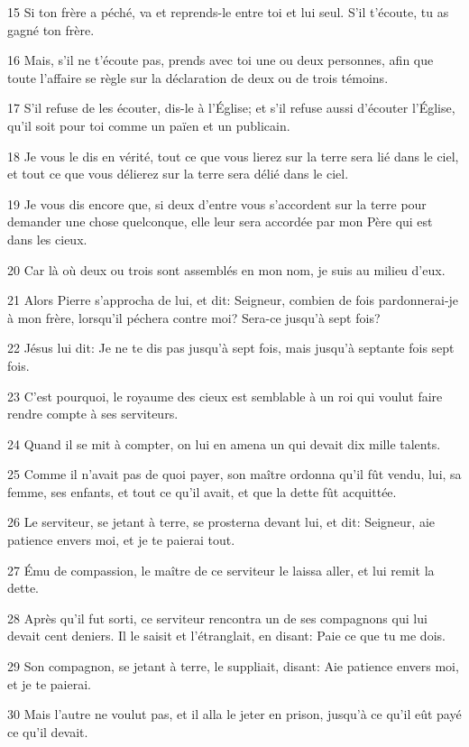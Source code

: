 \par 15 Si ton frère a péché, va et reprends-le entre toi et lui seul. S'il t'écoute, tu as gagné ton frère.
\par 16 Mais, s'il ne t'écoute pas, prends avec toi une ou deux personnes, afin que toute l'affaire se règle sur la déclaration de deux ou de trois témoins.
\par 17 S'il refuse de les écouter, dis-le à l'Église; et s'il refuse aussi d'écouter l'Église, qu'il soit pour toi comme un païen et un publicain.
\par 18 Je vous le dis en vérité, tout ce que vous lierez sur la terre sera lié dans le ciel, et tout ce que vous délierez sur la terre sera délié dans le ciel.
\par 19 Je vous dis encore que, si deux d'entre vous s'accordent sur la terre pour demander une chose quelconque, elle leur sera accordée par mon Père qui est dans les cieux.
\par 20 Car là où deux ou trois sont assemblés en mon nom, je suis au milieu d'eux.
\par 21 Alors Pierre s'approcha de lui, et dit: Seigneur, combien de fois pardonnerai-je à mon frère, lorsqu'il péchera contre moi? Sera-ce jusqu'à sept fois?
\par 22 Jésus lui dit: Je ne te dis pas jusqu'à sept fois, mais jusqu'à septante fois sept fois.
\par 23 C'est pourquoi, le royaume des cieux est semblable à un roi qui voulut faire rendre compte à ses serviteurs.
\par 24 Quand il se mit à compter, on lui en amena un qui devait dix mille talents.
\par 25 Comme il n'avait pas de quoi payer, son maître ordonna qu'il fût vendu, lui, sa femme, ses enfants, et tout ce qu'il avait, et que la dette fût acquittée.
\par 26 Le serviteur, se jetant à terre, se prosterna devant lui, et dit: Seigneur, aie patience envers moi, et je te paierai tout.
\par 27 Ému de compassion, le maître de ce serviteur le laissa aller, et lui remit la dette.
\par 28 Après qu'il fut sorti, ce serviteur rencontra un de ses compagnons qui lui devait cent deniers. Il le saisit et l'étranglait, en disant: Paie ce que tu me dois.
\par 29 Son compagnon, se jetant à terre, le suppliait, disant: Aie patience envers moi, et je te paierai.
\par 30 Mais l'autre ne voulut pas, et il alla le jeter en prison, jusqu'à ce qu'il eût payé ce qu'il devait.
